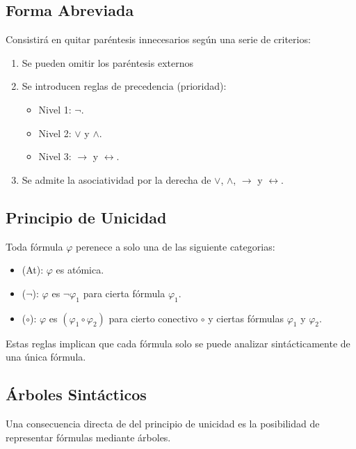 \documentclass[10pt,a4paper]{article}
\begin{document}
\subsection{Forma Abreviada}
Consistirá en quitar paréntesis innecesarios según una serie de criterios:
	\begin{enumerate}
		\item Se pueden omitir los paréntesis externos
		\item Se introducen reglas de precedencia (prioridad):
			\begin{itemize}
				\item Nivel 1: $\neg$.
				\item Nivel 2: $\lor$ y $\land$.
				\item Nivel 3: $\rightarrow$ y $\leftrightarrow$.
			\end{itemize}
		\item Se admite la asociatividad por la derecha de $\lor$, $\land$, $\rightarrow$ y $\leftrightarrow$.
	\end{enumerate}

\subsection{Principio de Unicidad}
Toda fórmula $\varphi$ perenece a solo una de las siguiente categorias:
\begin{itemize}
	\item (At): $\varphi$ es atómica.
	\item ($\neg$): $\varphi$ es $\neg\varphi_1$ para cierta fórmula $\varphi_1$.
	\item ($\circ$): $\varphi$ es $(\varphi_1\circ\varphi_2)$ para cierto conectivo $\circ$ y ciertas fórmulas $\varphi_1$ y $\varphi_2$.
\end{itemize}
Estas reglas implican que cada fórmula solo se puede analizar sintácticamente de una única fórmula.
\subsection{Árboles Sintácticos}
Una consecuencia directa de del principio de unicidad es la posibilidad de representar fórmulas mediante árboles.
\end{document}
